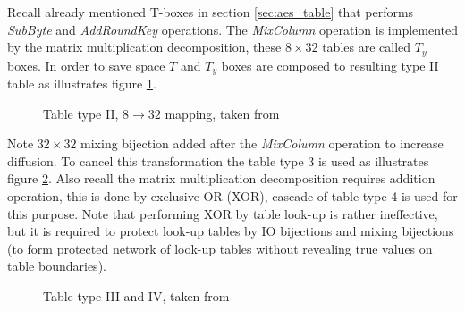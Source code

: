 \documentclass[11pt,oneside,final]{fithesis2}
\begin{document}
    Recall already mentioned T-boxes in section \ref{sec:aes_table} that performs \emph{SubByte} and \emph{AddRoundKey} operations. The \emph{MixColumn} operation 
    is implemented by the matrix multiplication decomposition, these $8\times32$ tables are called $T_y$ boxes. In order to save space
    $T$ and $T_y$ boxes are composed to resulting type II table as illustrates figure \ref{fig:aes_t2}.

    \begin{figure}[!htb]
    \begin{center}
    \leavevmode
    \centerline{}
    \end{center}
    \caption{Table type II, $8\rightarrow32$ mapping, taken from \citep{wyseurPhd}}
    \label{fig:aes_t2}
    \end{figure}

    Note $32\times32$ mixing bijection added after the \emph{MixColumn} operation to increase diffusion. To cancel this transformation the table 
    type 3 is used as illustrates figure \ref{fig:aes_t3_t4}. Also recall the matrix multiplication decomposition requires addition operation, this is done
    by exclusive-OR (XOR), cascade of table type 4 is used for this purpose. Note that performing XOR by table look-up is rather ineffective, but it is required to 
    protect look-up tables by IO bijections and mixing bijections (to form protected network of look-up tables without revealing true values on 
    table boundaries).
    
    \begin{figure}[!htb]
    \begin{center}
    \leavevmode
    \centerline{}
    \end{center}
    \caption{Table type III and IV, taken from \citep{wyseurPhd}}
    \label{fig:aes_t3_t4}
    \end{figure}
        
\end{document}
